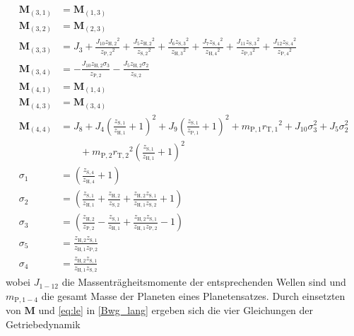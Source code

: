 \begin{align*}
	\pmb{M}_{(3,1)} &= \pmb{M}_{(1,3)}\\
	\pmb{M}_{(3,2)} &= \pmb{M}_{(2,3)}\\
	\pmb{M}_{(3,3)} &= J_{3}+\frac{J_{10} {z_\mathrm{H,2}}^2}{{z_\mathrm{P,2}}^2}+\frac{J_{5} {z_\mathrm{H,2}}^2}{{z_\mathrm{S,2}}^2}+\frac{J_{6} {z_\mathrm{S,3}}^2}{{z_\mathrm{H,3}}^2}+\frac{J_{7} {z_\mathrm{S,4}}^2}{{z_\mathrm{H,4}}^2}+\frac{J_{11} {z_\mathrm{S,3}}^2}{{z_\mathrm{P,3}}^2}+\frac{J_{12} {z_\mathrm{S,4}}^2}{{z_\mathrm{P,4}}^2} \\
	\pmb{M}_{(3,4)} &= -\frac{J_{10} z_\mathrm{H,2} \sigma_{3}}{z_\mathrm{P,2}} - \frac{J_{5} z_\mathrm{H,2} \sigma_{2}}{z_\mathrm{S,2}}\\
	\pmb{M}_{(4,1)} &= \pmb{M}_{(1,4)}\\
	\pmb{M}_{(4,3)} &= \pmb{M}_{(3,4)}\\
	\pmb{M}_{(4,4)} &= J_8+J_4 \left(\frac{z_\mathrm{S,1}}{z_\mathrm{H,1}}+1\right)^2+J_{9} \left(\frac{z_\mathrm{S,1}}{z_\mathrm{P,1}}+1\right)^2+m_\mathrm{P,1} {r_\mathrm{T,1}}^2+J_{10} \sigma_{3}^2+J_5 \sigma_{2}^2 \\
		&\qquad + m_\mathrm{P,2} {r_\mathrm{T,2}}^2 \left(\frac{z_\mathrm{S,1}}{z_\mathrm{H,1}}+1\right)^2\\
	\sigma_1 &= \left(\frac{z_{\mathrm{S,4}}}{z_{\mathrm{H,4}}}+1\right) \\
	\sigma_{2} &= \left(\frac{z_\mathrm{S,1}}{z_\mathrm{H,1}}+\frac{z_\mathrm{H,2}}{z_\mathrm{S,2}}+\frac{z_\mathrm{H,2} z_\mathrm{S,1}}{z_\mathrm{H,1} z_\mathrm{S,2}}+1\right)\\
	\sigma_{3} &= \left(\frac{z_\mathrm{H,2}}{z_\mathrm{P,2}}-\frac{z_\mathrm{S,1}}{z_\mathrm{H,1}}+\frac{z_\mathrm{H,2} z_\mathrm{S,1}}{z_\mathrm{H,1} z_\mathrm{P,2}}-1\right) \\
	\sigma_{5} &= \frac{z_\mathrm{H,2} z_\mathrm{S,1}}{z_\mathrm{H,1} z_\mathrm{P,2}} \\
	\sigma_{4} &= \frac{z_\mathrm{H,2} z_\mathrm{S,1}}{z_\mathrm{H,1} z_\mathrm{S,2}}
\end{align*}
wobei $J_{1-12}$ die Massenträgheitsmomente der entsprechenden Wellen sind und $m_{\mathrm{P},1-4}$ die gesamt Masse der Planeten eines Planetensatzes. Durch einsetzten von $\pmb{M}$ und \eqref{eq:le} in \eqref{Bwg_lang} ergeben sich die vier Gleichungen der Getriebedynamik

